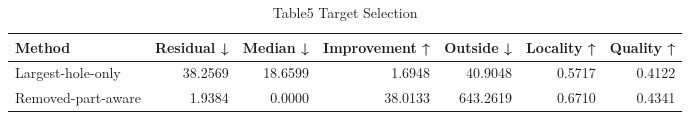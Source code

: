 \begin{table}
\caption{Table5 Target Selection}
\label{tab:table5_target_selection}
\begin{tabular}{lrrrrrr}
\toprule
Method & Residual ↓ & Median ↓ & Improvement ↑ & Outside ↓ & Locality ↑ & Quality ↑ \\
\midrule
Largest-hole-only & 38.2569 & 18.6599 & 1.6948 & 40.9048 & 0.5717 & 0.4122 \\
Removed-part-aware & 1.9384 & 0.0000 & 38.0133 & 643.2619 & 0.6710 & 0.4341 \\
\bottomrule
\end{tabular}
\end{table}
